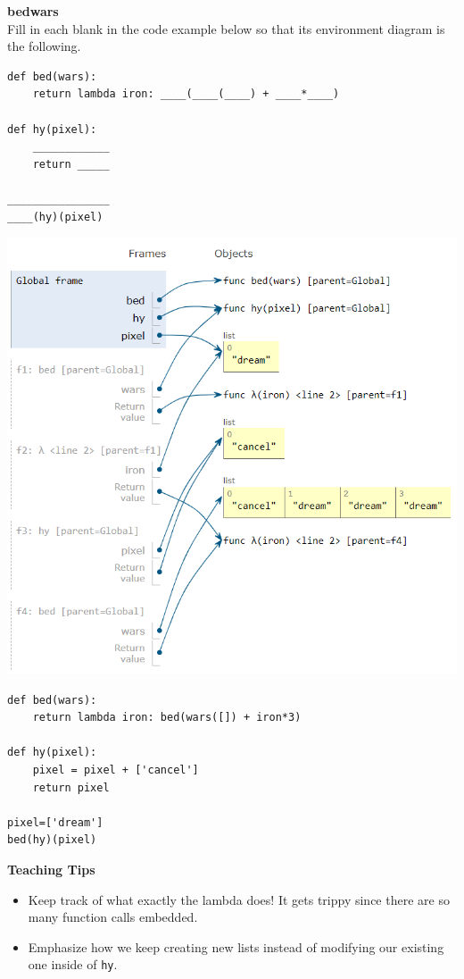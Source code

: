 \begin{blocksection}
\question
\textbf{bedwars}\\
Fill in each blank in the code example below so that its environment diagram is the following.

\begin{multicols}{2}
\begin{lstlisting}
def bed(wars):
    return lambda iron: ____(____(____) + ____*____)

def hy(pixel):
    ____________
    return _____

________________
____(hy)(pixel)
\end{lstlisting}

\includegraphics[width=.5\textwidth]{bedwars.png}
\end{multicols}

\begin{solution}[2in]
\begin{lstlisting}
def bed(wars):
    return lambda iron: bed(wars([]) + iron*3)

def hy(pixel):
    pixel = pixel + ['cancel']
    return pixel

pixel=['dream']
bed(hy)(pixel)
\end{lstlisting}
\end{solution}
\end{blocksection}

\begin{blocksection}
\begin{guide}
\textbf{Teaching Tips}
\begin{itemize}
\item Keep track of what exactly the lambda does! It gets trippy since there are so many function calls embedded.
\item Emphasize how we keep creating new lists instead of modifying our existing one inside of \texttt{hy}.
\end{itemize}
\end{guide}
\end{blocksection}
